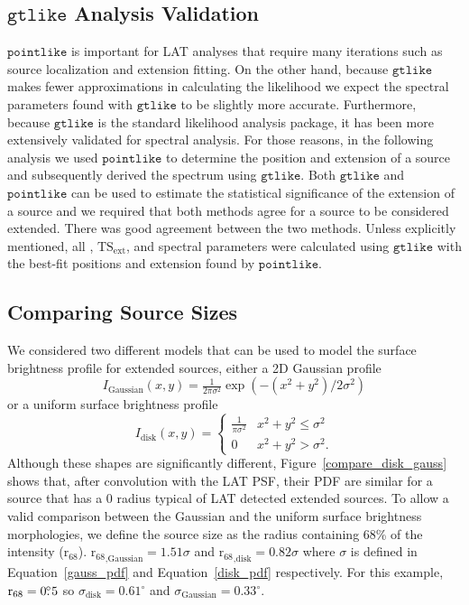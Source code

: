 \documentclass[12pt,preprint]{aastex}
\newcommand{\tsext}{{\ensuremath{\text{TS}_{\text{ext}}}}\xspace}
\newcommand{\rsixeight}{{\ensuremath{\text{r}_{68}}}\xspace}
\newcommand{\ts}{\text{TS}\xspace}
\newcommand{\gtlike}{\ensuremath{\mathtt{gtlike}}\xspace}
\newcommand{\pointlike}{\ensuremath{\mathtt{pointlike}}\xspace}
\newcommand{\degree}{^\circ\xspace}
\begin{document}
\subsection{\gtlike Analysis Validation}
\label{gtlike_crosscheck}

\pointlike is important for LAT analyses that require many iterations
such as source localization and extension fitting.  On the other hand,
because \gtlike makes fewer approximations in calculating the likelihood
we expect the spectral parameters found with \gtlike to be slightly more
accurate.  Furthermore, because \gtlike is the standard likelihood analysis
package, it has been more extensively validated for spectral analysis.
For those reasons, in the following analysis we used \pointlike to
determine the position and extension of a source and subsequently derived
the spectrum using \gtlike. Both \gtlike and \pointlike can be used to
estimate the statistical significance of the extension of a source and we
required that both methods agree for a source to be considered extended.
There was good agreement between the two methods.  Unless explicitly
mentioned, all \ts, \tsext, and spectral parameters were calculated using
\gtlike with the best-fit positions and extension found by \pointlike.


\subsection{Comparing Source Sizes}

\label{compare_source_size}

We considered two different models that can be used to model the
surface brightness profile for extended sources, either a 2D Gaussian
profile
\begin{equation}\label{gauss_pdf}
  I_\text{Gaussian}(x,y)=\tfrac{1}{2\pi\sigma^2}\exp\left(-(x^2+y^2)/2\sigma^2\right)
\end{equation}
or a uniform surface brightness profile
\begin{equation}\label{disk_pdf}
  I_\text{disk}(x,y)=
  \begin{cases}
    \frac{1}{\pi\sigma^2} & x^2+y^2\le\sigma^2 \\
    0                      & x^2+y^2>\sigma^2.
  \end{cases}
\end{equation}
Although these shapes are significantly different,
Figure~\ref{compare_disk_gauss} shows that, after convolution with the
LAT PSF, their PDF are similar for a source that has a 0 radius
typical of LAT detected extended sources.  To allow a valid comparison
between the Gaussian and the uniform surface brightness morphologies,
we define the source size as the radius containing 68\% of the
intensity ($\rsixeight$).  $\rsixeight_\text{,Gaussian}=1.51\sigma$
and $\rsixeight_\text{,disk}=0.82\sigma$ where $\sigma$ is defined
in Equation~\ref{gauss_pdf} and Equation~\ref{disk_pdf} respectively.
For this example, $\rsixeight=0\fdg5$ so $\sigma_\text{disk}=0.61\degree$
and $\sigma_\text{Gaussian}=0.33\degree$.
\end{document}
